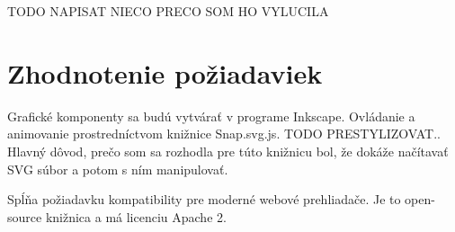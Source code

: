 TODO NAPISAT NIECO PRECO SOM HO VYLUCILA

%

\section{Zhodnotenie požiadaviek}
Grafické komponenty sa budú vytvárať v programe Inkscape. Ovládanie a animovanie prostredníctvom knižnice Snap.svg.js. 
TODO PRESTYLIZOVAT.. 
Hlavný dôvod, prečo som sa rozhodla pre túto  knižnicu bol, že dokáže načítavať SVG súbor a potom s ním manipulovať.
 
Spĺňa požiadavku kompatibility pre moderné webové prehliadače. Je to open-source knižnica a má licenciu Apache 2.  